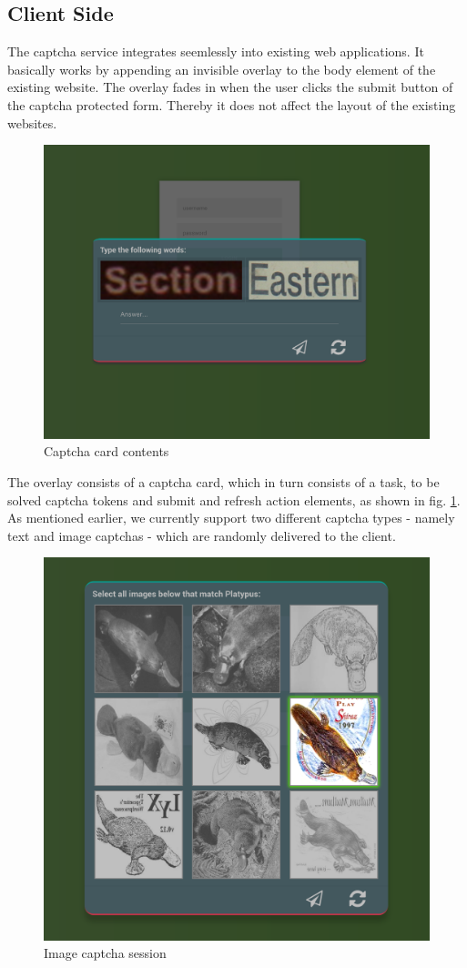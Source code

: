 \subsection{Client Side}
\label{subsec:Client Side}
The captcha service integrates seemlessly into existing web applications. It basically works by appending an invisible overlay to the body element of the existing website. The overlay fades in when the user clicks the submit button of the captcha protected form. Thereby it does not affect the layout of the existing websites.
\begin{figure}[!h]
	\centering
	\includegraphics[width=0.7\linewidth]{content/figures/captcha_words.png}
	\caption{Captcha card contents}
	\label{fig:captcha_words}
\end{figure}

 The overlay consists of a captcha card, which in turn consists of a task, to be solved captcha tokens and submit and refresh action elements, as shown in fig. \ref{fig:captcha_words}. As mentioned earlier, we currently support two different captcha types - namely text and image captchas - which are randomly delivered to the client. 
 
 \begin{figure}[!h]
	\centering
	\includegraphics[width=0.7\linewidth]{content/figures/captcha_images.png}
	\caption{Image captcha session}
	\label{fig:captcha_images}
\end{figure}
 
